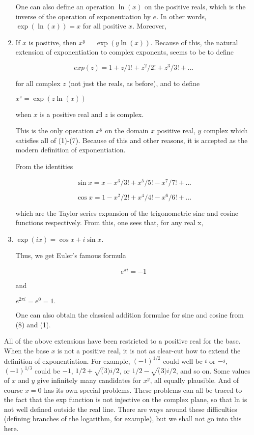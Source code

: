 \begin{enumerate}
  One can also define an operation $\ln(x)$ on the positive reals, which
  is the inverse of the operation of exponentiation by $e$.  In other
  words, $\exp(\ln(x)) = x$ for all positive $x$.  Moreover,

  \item If $x$ is positive, then $x^y$ = $\exp(y \ln(x))$.  Because of
  this, the natural extension of exponentiation to complex exponents,
  seems to be to define

  \[ exp(z) = 1 + z/1! + z^2/2! + z^3/3! + ...\]

  for all complex $z$ (not just the reals, as before), and to define

  $x^z = \exp(z \ln(x))$

  when $x$ is a positive real and $z$ is complex.

  This is the only operation $x^y$ on the domain {$x$ positive real, $y$
    complex} which satisfies all of (1)-(7).  Because of this and other
  reasons, it is accepted as the modern definition of exponentiation.

  From the identities

  \[ \sin x = x - x^3/3! + x^5/5! - x^7/7! + ...\]

  \[ \cos x = 1 - x^2/2! + x^4/4! - x^6/6! + ... \]

  which are the Taylor series expansion of the trigonometric sine and
  cosine functions respectively.  From this, one sees that, for any real
  x,

  \item $ \exp(ix) = \cos x + i \sin x.$

  Thus, we get Euler's famous formula

  \[e^{\pi i} = -1\]

  and

  $e^{2\pi i} = e^0 = 1.$

  One can also obtain the classical addition formulae for sine and
  cosine from (8) and (1).
\end{enumerate}

All of the above extensions have been restricted to a positive real for
the base.  When the base $x$ is not a positive real, it is not as
clear-cut how to extend the definition of exponentiation.  For example,
$(-1)^{1/2}$ could well be $i$ or $-i$, $(-1)^{1/3}$ could be $-1$, $1/2
+ \sqrt(3)i/2$, or $1/2 - \sqrt(3)i/2$, and so on.  Some values of $x$
and $y$ give infinitely many candidates for $x^y$, all equally
plausible.  And of course $x=0$ has its own special problems.  These
problems can all be traced to the fact that the exp function is not
injective on the complex plane, so that ln is not well defined outside
the real line.  There are ways around these difficulties (defining
branches of the logarithm, for example), but we shall not go into this
here.

